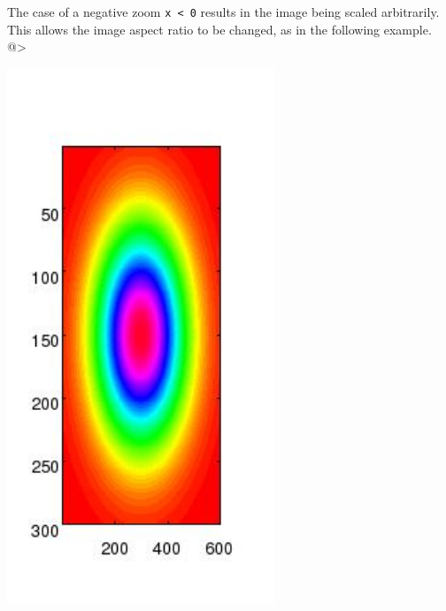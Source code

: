 The case of a negative zoom \verb|x < 0| results in the image being scaled arbitrarily.
This allows the image aspect ratio to be changed, as in the following example.
@>


\centerline{\includegraphics[width=8cm]{zoom6}}

